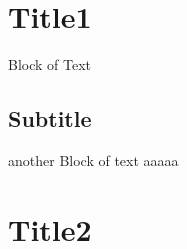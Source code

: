 
\section{Title1}
Block
of
Text
\subsection{Subtitle}
another Block of text
aaaaa
\section{Title2}

